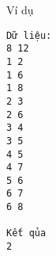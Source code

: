 Ví dụ
\begin{verbatim}
Dữ liệu:
8 12
1 2
1 6
1 8
2 3
2 6
3 4
3 5
4 5
4 7
5 6
6 7
6 8

Kết qủa
2
\end{verbatim}